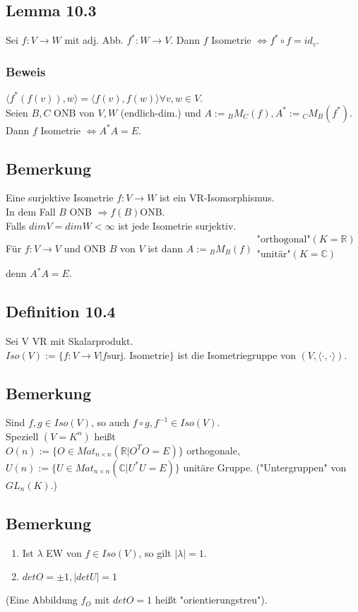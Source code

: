 \documentclass[a4paper, 12pt]{extarticle}
\newcommand{\skalar}[2] {
	\langle #1, #2\rangle
}
\begin{document}
\subsection*{Lemma 10.3}
Sei $f: V \longrightarrow W$ mit adj. Abb. $f^* : W \longrightarrow V$. Dann $f$ Isometrie $\Leftrightarrow f^* \circ f = id_v$.
\subsubsection*{Beweis}
$\skalar{f^*(f(v))}{w} = \skalar{f(v)}{f(w)} \forall v,w \in V.$\\
Seien $B, C$ ONB von $V, W$ (endlich-dim.) und $A:= {}_BM_C(f), A^* := {}_CM_B(f^*).$
Dann $f$ Isometrie $\Leftrightarrow A^*A = E$.
\subsection*{Bemerkung}
Eine surjektive Isometrie $f: V \longrightarrow W$ ist ein VR-Isomorphismus.\\
In dem Fall $B$ ONB $\Rightarrow f(B)$ONB.\\
Falls $dimV = dimW < \infty$ ist jede Isometrie surjektiv.\\
Für $f: V\longrightarrow V$ und ONB $B$ von $V$ ist dann $A := {}_BM_B(f) \begin{matrix}
	\text{"orthogonal"} (K = \mathbb{R})\\
	\text{"unitär"} (K = \mathbb{C})\\
\end{matrix}$ denn $A^*A = E$.
\subsection*{Definition 10.4}
Sei V VR mit Skalarprodukt.\\
$Iso(V) := \{f:V\longrightarrow V | f \text{surj. Isometrie}\}$ ist die Isometriegruppe von $(V, \skalar{\cdot}{\cdot})$.\\
\subsection*{Bemerkung}
Sind $f,g \in Iso(V)$, so auch $f\circ g, f^{-1} \in Iso(V)$.\\
Speziell $(V = K^n)$ heißt\\
$O(n) := \{O \in Mat_{n\times n}(\mathbb{R} | O^TO = E)\}$ orthogonale, \\
$U(n) := \{U \in Mat_{n\times n}(\mathbb{C} | U^*U = E)\}$ unitäre Gruppe. ("Untergruppen" von $GL_n(K)$.)
\subsection*{Bemerkung}
\begin{enumerate}[label = \alph*)]
	\item Ist $\lambda$ EW von $f \in Iso(V)$, so gilt $|\lambda| = 1$.
	\item $detO = \pm 1 , |detU| = 1$ 
\end{enumerate}
(Eine Abbildung $f_O$ mit $detO = 1$ heißt "orientierungstreu").
\end{document}
